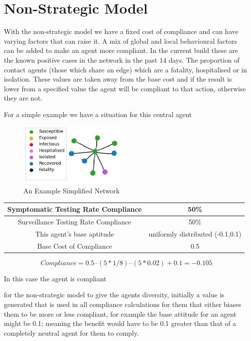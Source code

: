 \documentclass{article}
\begin{document}
\newpage

\section{Non-Strategic Model}
With the non-strategic model we have a fixed cost of compliance and can have varying factors that can raise it. A mix of global and local behavioural factors can be added to make an agent more compliant. In the current build these are the known positive cases in the network in the past 14 days. The proportion of contact agents (those which share an edge) which are a fatality, hospitalised or in isolation. These values are taken away from the base cost and if the result is lower from a specified value the agent will be compliant to that action, otherwise they are not.\newline

For a simple example we have a situation for this central agent\newline

\begin{figure}
\centering
\includegraphics[width =150pt]{basicnet}
\caption{An Example Simplified Network}
\end{figure}


\begin{tabular}{|c|c|}
\hline
Symptomatic Testing Rate Compliance & 50\% \\ \hline
Surveillance Testing Rate Compliance & 50\% \\ \hline
This agent’s base aptitude & uniformly distributed (-0.1,0.1) \\ \hline
Base Cost of Compliance & 0.5 \\ \hline
\end{tabular}



\[Compliance = 0.5 – (5 * 1/8) – (5*0.02) + 0.1 = -0.105\]\newline



In this case the agent is compliant

for the non-strategic model to give the agents diversity, initially a value is generated that is used in all compliance calculations for them that either biases them to be more or less compliant, for example the base attitude for an agent might be 0.1; meaning the benefit would have to be 0.1 greater than that of a completely neutral agent for them to comply.\newline
\end{document}
